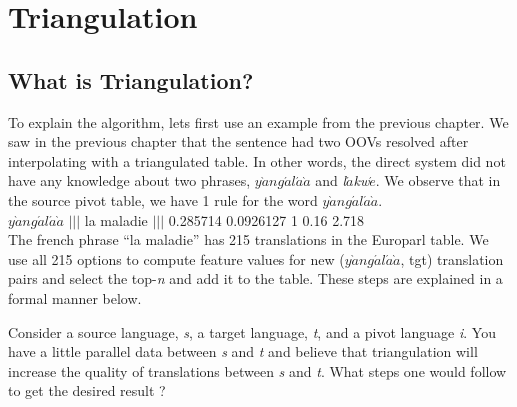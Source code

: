 \chapter{Triangulation}
\label{chap:triangulation}


\section{What is Triangulation?}
\label{sec:triangulation}
To explain the algorithm, lets first use an example from the previous chapter. We saw in the previous chapter that the sentence \mawuexample had two OOVs resolved after interpolating with a triangulated table. In other words, the direct system did not have any knowledge about two phrases, \emph{$y\grave{a}ng\acute{a}l\acute{a}\grave{a}$} and \emph{l$\acute{a}$kw$\acute{e}$}. We observe that in the source pivot table, we have 1 rule for the word \emph{$y\grave{a}ng\acute{a}l\acute{a}\grave{a}$}. \\

\indent
    \emph{$y\grave{a}ng\acute{a}l\acute{a}\grave{a}$} $|||$ la maladie $|||$ 0.285714 0.0926127 1 0.16 2.718\\

The french phrase ``la maladie'' has 215 translations in the Europarl table. We use all 215 options to compute feature values for new (\emph{$y\grave{a}ng\acute{a}l\acute{a}\grave{a}$}, tgt) translation pairs and select the top-\emph{n} and add it to the table. These steps are explained in a formal manner below. 



Consider a source language, \emph{s}, a target language, \emph{t}, and a pivot language \emph{i}. You have a little parallel data between \emph{s} and \emph{t} and believe that triangulation will increase the quality of translations between \emph{s} and \emph{t}. What steps one would follow to get the desired result ?

